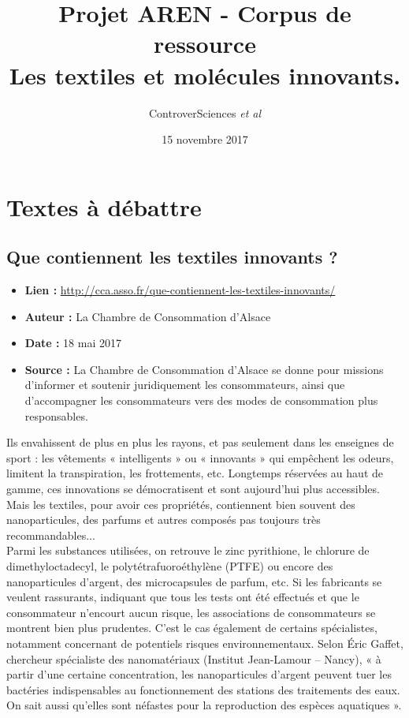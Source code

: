 \documentclass[8pt]{article}
\author{ControverSciences\textit{ et al} }
\title{Projet AREN - Corpus de ressource \\  Les textiles et molécules innovants.}
\date{15 novembre 2017}
\begin{document}
\maketitle

\tableofcontents

\newpage
\section{Textes à débattre}
\subsection{Que contiennent les textiles innovants ?}
\begin{itemize}
	\item \textbf{Lien : }  \url{http://cca.asso.fr/que-contiennent-les-textiles-innovants/} 
	\item \textbf{Auteur : } La Chambre de Consommation d'Alsace
	\item \textbf{Date : }  18 mai 2017
	\item \textbf{Source : }  La Chambre de Consommation d'Alsace se donne pour missions d'informer et soutenir juridiquement les consommateurs, ainsi que d'accompagner les consommateurs vers des modes de consommation plus responsables.
\end{itemize}

Ils envahissent de plus en plus les rayons, et pas seulement dans les enseignes de sport : les vêtements « intelligents » ou « innovants » qui empêchent les odeurs, limitent la transpiration, les frottements, etc. Longtemps réservées au haut de gamme, ces innovations se démocratisent et sont aujourd’hui plus accessibles. Mais les textiles, pour avoir ces propriétés, contiennent bien souvent des nanoparticules, des parfums et autres composés pas toujours très recommandables...\\

Parmi les substances utilisées, on retrouve le zinc pyrithione, le chlorure de dimethyloctadecyl, le polytétrafuoroéthylène (PTFE) ou encore des nanoparticules d’argent, des microcapsules de parfum, etc. Si les fabricants se veulent rassurants, indiquant que tous les tests ont été effectués et que le consommateur n’encourt aucun risque, les associations de consommateurs se montrent bien plus prudentes. C’est le cas également de certains spécialistes, notamment concernant de potentiels risques environnementaux. Selon Éric Gaffet, chercheur spécialiste des nanomatériaux (Institut Jean-Lamour – Nancy), « à partir d’une certaine concentration, les nanoparticules d’argent peuvent tuer les bactéries indispensables au fonctionnement des stations des traitements des eaux. On sait aussi qu’elles sont néfastes pour la reproduction des espèces aquatiques ».\\
\end{document}
